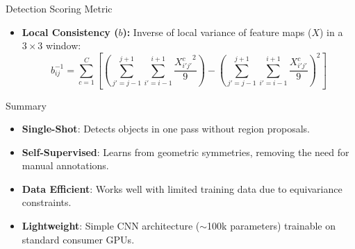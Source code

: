 \begin{frame}{Detection Scoring Metric}
    \begin{itemize}
        \item \textbf{Local Consistency ($b$):} Inverse of local variance of feature maps ($X$) in a $3\times3$ window:
        \begin{equation*}
            b_{ij}^{-1} = \sum_{c=1}^{C} \left[ \left( \sum_{j'=j-1}^{j+1} \sum_{i'=i-1}^{i+1} \frac{{X^c_{i'j'}}^2}{9} \right) - \left( \sum_{j'=j-1}^{j+1} \sum_{i'=i-1}^{i+1} \frac{X^c_{i'j'}}{9} \right)^2 \right]
        \end{equation*}
    \end{itemize}
\end{frame}

\begin{frame}{Summary}
\begin{itemize}
    \item \textbf{Single-Shot}: Detects objects in one pass without region proposals.
    \item \textbf{Self-Supervised}: Learns from geometric symmetries, removing the need for manual annotations.
    \item \textbf{Data Efficient}: Works well with limited training data due to equivariance constraints.
    \item \textbf{Lightweight}: Simple CNN architecture ($\sim$100k parameters) trainable on standard consumer GPUs.
\end{itemize}
\end{frame}
